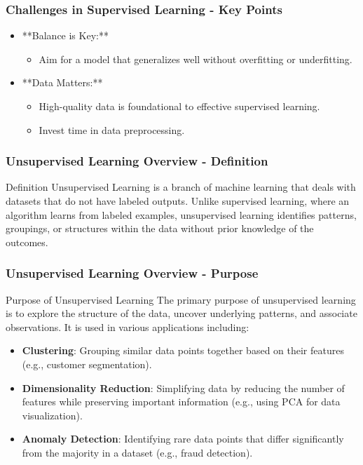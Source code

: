 \documentclass[aspectratio=169]{beamer}
\begin{document}
\begin{frame}[fragile]
    \frametitle{Challenges in Supervised Learning - Key Points}
    \begin{itemize}
        \item **Balance is Key:** 
            \begin{itemize}
                \item Aim for a model that generalizes well without overfitting or underfitting.
            \end{itemize}
        \item **Data Matters:** 
            \begin{itemize}
                \item High-quality data is foundational to effective supervised learning.
                \item Invest time in data preprocessing.
            \end{itemize}
    \end{itemize}
\end{frame}

\begin{frame}[fragile]
    \frametitle{Unsupervised Learning Overview - Definition}
    \begin{block}{Definition}
        Unsupervised Learning is a branch of machine learning that deals with datasets that do not have labeled outputs. Unlike supervised learning, 
        where an algorithm learns from labeled examples, unsupervised learning identifies patterns, groupings, or structures within the data without prior knowledge of the outcomes.
    \end{block}
\end{frame}

\begin{frame}[fragile]
    \frametitle{Unsupervised Learning Overview - Purpose}
    \begin{block}{Purpose of Unsupervised Learning}
        The primary purpose of unsupervised learning is to explore the structure of the data, uncover underlying patterns, and associate observations. 
        It is used in various applications including:
    \end{block}
    \begin{itemize}
        \item \textbf{Clustering}: Grouping similar data points together based on their features (e.g., customer segmentation).
        \item \textbf{Dimensionality Reduction}: Simplifying data by reducing the number of features while preserving important information (e.g., using PCA for data visualization).
        \item \textbf{Anomaly Detection}: Identifying rare data points that differ significantly from the majority in a dataset (e.g., fraud detection).
    \end{itemize}
\end{frame}
\end{document}
